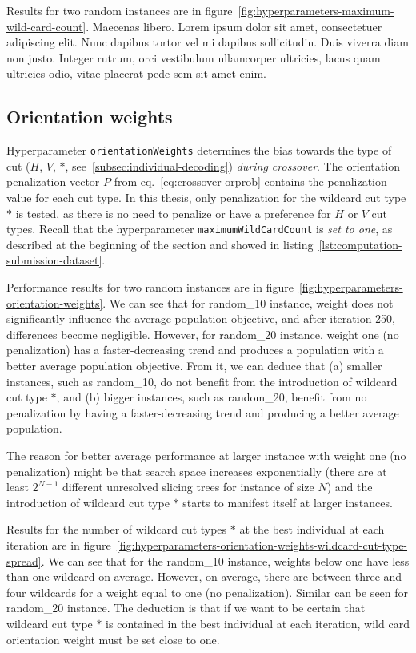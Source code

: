 Results for two random instances are in figure~\ref{fig:hyperparameters-maximum-wild-card-count}.
Maecenas libero. Lorem ipsum dolor sit amet, consectetuer adipiscing elit. Nunc dapibus tortor vel mi dapibus sollicitudin. Duis viverra diam non justo. Integer rutrum, orci vestibulum ullamcorper ultricies, lacus quam ultricies odio, vitae placerat pede sem sit amet enim.

\subsection{Orientation weights}\label{subsec:orientation-weights}
Hyperparameter \verb|orientationWeights| determines the bias towards the type of cut ($H$, $V$, $*$, see~\ref{subsec:individual-decoding}) \textit{during crossover}.
The orientation penalization vector $P$ from eq.~\ref{eq:crossover-orprob} contains the penalization value for each cut type.
In this thesis, only penalization for the wildcard cut type $*$ is tested, as there is no need to penalize or have a preference for $H$ or $V$ cut types.
Recall that the hyperparameter \verb|maximumWildCardCount| is \textit{set to one}, as described at the beginning of the section and showed in listing~\ref{lst:computation-submission-dataset}.

Performance results for two random instances are in figure~\ref{fig:hyperparameters-orientation-weights}.
We can see that for random\_10 instance,
weight does not significantly influence the average population objective, and after iteration 250, differences become negligible.
However, for random\_20 instance,
weight one (no penalization) has a faster-decreasing trend and produces a population with a better average population objective.
From it, we can deduce that (a) smaller instances, such as random\_10, do not benefit from the introduction of wildcard cut type $*$,
and (b) bigger instances, such as random\_20, benefit from no penalization by having a faster-decreasing trend and producing a better average population.

The reason for better average performance at larger instance with weight one (no penalization) might
be that search space increases exponentially (there are at least $2^{N-1}$ different unresolved slicing trees for instance of size $N$) and the introduction of wildcard cut type $*$ starts to manifest itself
at larger instances.

Results for the number of wildcard cut types $*$ at the best individual at each iteration are in
figure~\ref{fig:hyperparameters-orientation-weights-wildcard-cut-type-spread}.
We can see that for the random\_10 instance, weights below one have less than one wildcard on average.
However, on average, there are between three and four wildcards for a weight equal to one (no penalization).
Similar can be seen for random\_20 instance.
The deduction is that if we want to be certain that wildcard cut type $*$ is contained in the best individual at each iteration,
wild card orientation weight must be set close to one.

